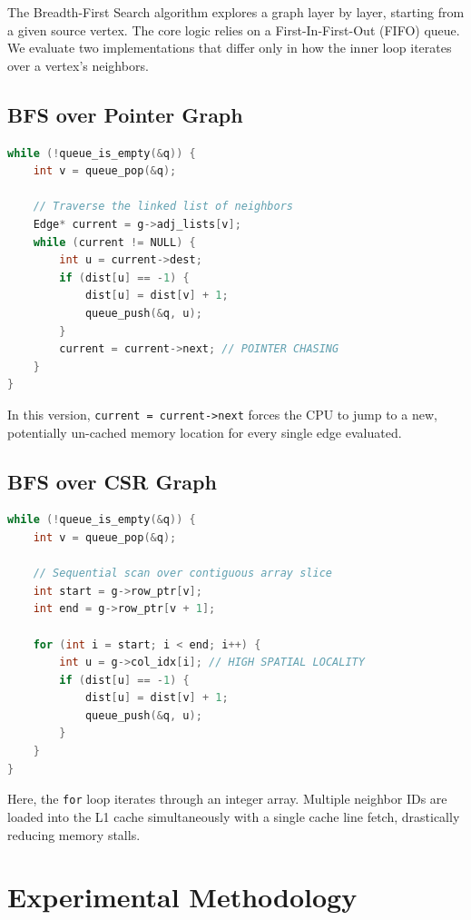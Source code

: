 \documentclass[11pt]{article}
\begin{document}
The Breadth-First Search algorithm explores a graph layer by layer, starting from a given source vertex. The core logic relies on a First-In-First-Out (FIFO) queue. We evaluate two implementations that differ only in how the inner loop iterates over a vertex's neighbors.

\subsection{BFS over Pointer Graph}

\begin{lstlisting}[language=C, caption=Core loop of Pointer BFS]
while (!queue_is_empty(&q)) {
    int v = queue_pop(&q);
    
    // Traverse the linked list of neighbors
    Edge* current = g->adj_lists[v];
    while (current != NULL) {
        int u = current->dest;
        if (dist[u] == -1) {
            dist[u] = dist[v] + 1;
            queue_push(&q, u);
        }
        current = current->next; // POINTER CHASING
    }
}
\end{lstlisting}
In this version, \texttt{current = current->next} forces the CPU to jump to a new, potentially un-cached memory location for every single edge evaluated.

\subsection{BFS over CSR Graph}

\begin{lstlisting}[language=C, caption=Core loop of CSR BFS]
while (!queue_is_empty(&q)) {
    int v = queue_pop(&q);
    
    // Sequential scan over contiguous array slice
    int start = g->row_ptr[v];
    int end = g->row_ptr[v + 1];
    
    for (int i = start; i < end; i++) {
        int u = g->col_idx[i]; // HIGH SPATIAL LOCALITY
        if (dist[u] == -1) {
            dist[u] = dist[v] + 1;
            queue_push(&q, u);
        }
    }
}
\end{lstlisting}
Here, the \texttt{for} loop iterates through an integer array. Multiple neighbor IDs are loaded into the L1 cache simultaneously with a single cache line fetch, drastically reducing memory stalls.

\section{Experimental Methodology}
\end{document}
